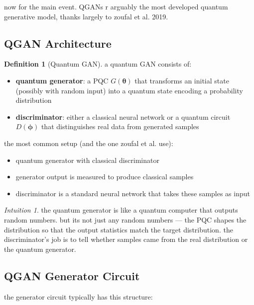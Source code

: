\documentclass[11pt,a4paper]{article}
\theoremstyle{definition}
\newtheorem{definition}{Definition}[section]
\theoremstyle{remark}
\newtheorem*{intuition}{Intuition}
\begin{document}
now for the main event. QGANs r arguably the most developed quantum generative model, thanks largely to zoufal et al. 2019.

\subsection{QGAN Architecture}

\begin{definition}[Quantum GAN]
a quantum GAN consists of:
\begin{itemize}[nosep]
    \item \textbf{quantum generator}: a PQC $G(\boldsymbol{\theta})$ that transforms an initial state (possibly with random input) into a quantum state encoding a probability distribution
    \item \textbf{discriminator}: either a classical neural network or a quantum circuit $D(\boldsymbol{\phi})$ that distinguishes real data from generated samples
\end{itemize}
\end{definition}

the most common setup (and the one zoufal et al. use):
\begin{itemize}[nosep]
    \item quantum generator with classical discriminator
    \item generator output is measured to produce classical samples
    \item discriminator is a standard neural network that takes these samples as input
\end{itemize}

\begin{intuition}
the quantum generator is like a quantum computer that outputs random numbers. but its not just any random numbers --- the PQC shapes the distribution so that the output statistics match the target distribution. the discriminator's job is to tell whether samples came from the real distribution or the quantum generator.
\end{intuition}

\subsection{QGAN Generator Circuit}

the generator circuit typically has this structure:
\end{document}
